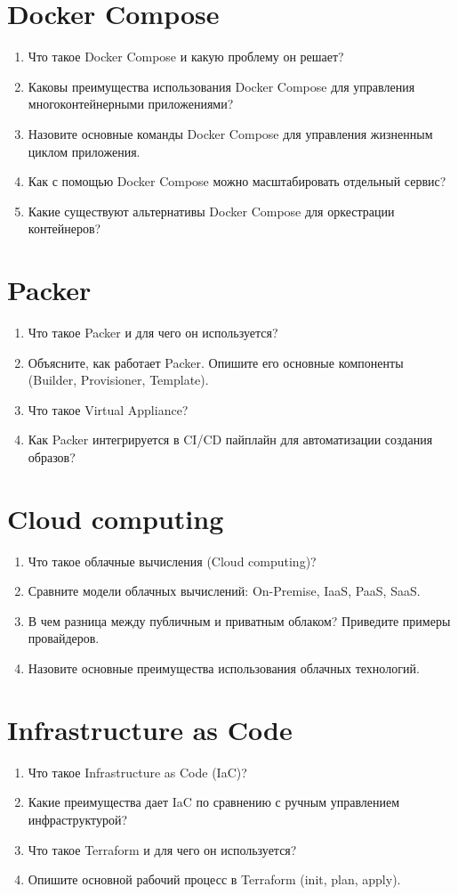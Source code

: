\documentclass[12pt,a4paper]{article}
\begin{document}
\section{Docker Compose}
\begin{enumerate}
    \item Что такое Docker Compose и какую проблему он решает?
    \item Каковы преимущества использования Docker Compose для управления многоконтейнерными приложениями?
    \item Назовите основные команды Docker Compose для управления жизненным циклом приложения.
    \item Как с помощью Docker Compose можно масштабировать отдельный сервис?
    \item Какие существуют альтернативы Docker Compose для оркестрации контейнеров?
\end{enumerate}

\section{Packer}
\begin{enumerate}
    \item Что такое Packer и для чего он используется?
    \item Объясните, как работает Packer. Опишите его основные компоненты (Builder, Provisioner, Template).
    \item Что такое Virtual Appliance?
    \item Как Packer интегрируется в CI/CD пайплайн для автоматизации создания образов?
\end{enumerate}

\section{Cloud computing}
\begin{enumerate}
    \item Что такое облачные вычисления (Cloud computing)?
    \item Сравните модели облачных вычислений: On-Premise, IaaS, PaaS, SaaS.
    \item В чем разница между публичным и приватным облаком? Приведите примеры провайдеров.
    \item Назовите основные преимущества использования облачных технологий.
\end{enumerate}

\section{Infrastructure as Code}
\begin{enumerate}
    \item Что такое Infrastructure as Code (IaC)?
    \item Какие преимущества дает IaC по сравнению с ручным управлением инфраструктурой?
    \item Что такое Terraform и для чего он используется?
    \item Опишите основной рабочий процесс в Terraform (init, plan, apply).
\end{enumerate}
\end{document}
